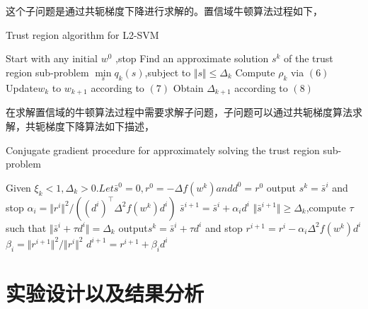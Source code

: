 \documentclass[master]{njuthesis}
\begin{document}
    这个子问题是通过共轭梯度下降进行求解的。置信域牛顿算法过程如下，
    \begin{algorithm}
    \caption{Trust region algorithm for L2-SVM}\label{TRON}
    \begin{algorithmic}[1]
      \State Start with any initial $w^0$
         ,stop
           \State Find an approximate solution $s^k$ of the trust region sub-problem
           \State $\min\limits_{s} q_k\left(s\right)$,subject to $\Vert s \Vert \le \Delta_k$
           \State Compute $\rho_k$ via $\left(6\right)$
           \State Update$w_k$ to $w_{k+1}$ according to $\left(7\right)$
           \State Obtain $\Delta_{k+1}$ according to $\left(8\right)$
         \EndIf
       \EndFor
    \EndProcedure
    \end{algorithmic}
    \end{algorithm}

    在求解置信域的牛顿算法过程中需要求解子问题，子问题可以通过共轭梯度算法求解，共轭梯度下降算法如下描述，
    \begin{algorithm}
    \caption{Conjugate gradient procedure for approximately solving the trust region sub-problem}\label{CG}
    \begin{algorithmic}[1]
      \State Given $\xi_k < 1,\Delta_k > 0. Let \bar{s}^0 = 0,r^0 = -\Delta f\left(w^k\right) and d^0 = r^0$
           \State output $s^k = \bar{s}^i $ and stop
         \EndIf
         \State $\alpha_i = \Vert r^i \Vert^2/\left(\left(d^i\right)^\intercal \Delta^2 f\left(w^k\right) d^i\right)$
         \State $\bar{s}^{i+1} = \bar{s}^{i} + \alpha_i d^i$
         \If $\Vert \bar{s}^{i+1} \Vert \ge \Delta_k$,compute $\tau$ such that
           \State $\Vert \bar{s}^i + \tau d^i \Vert = \Delta_k$
           \State output$s^k = \bar{s}^i + \tau d^i$ and stop
         \EndIf
         \State $r^{i+1} = r^{i} - \alpha_i \Delta^2 f\left(w^k\right) d^i$
         \State $\beta_i = \Vert r^{i+1} \Vert^2 / \Vert r^i \Vert^2$
         \State $d^{i+1} = r^{i+1} + \beta_i d^i$
       \EndFor
    \EndProcedure
    \end{algorithmic}
    \end{algorithm}

\section{实验设计以及结果分析}
\end{document}

